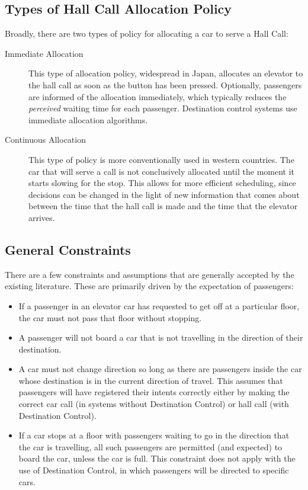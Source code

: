 \documentclass{UoYCSproject}
\begin{document}
\subsection{Types of Hall Call Allocation Policy}

Broadly, there are two types of policy for allocating a car to serve a Hall Call:  \citep{Bao1994, Rong2003, Nikovski2003}

\begin{description}
	\item[Immediate Allocation] This type of allocation policy, widespread in Japan, allocates an elevator to the hall call as soon as the button has been pressed.  Optionally, passengers are informed of the allocation immediately, which typically reduces the \textit{perceived} waiting time for each passenger.  Destination control systems use immediate allocation algorithms.
	\item[Continuous Allocation] This type of policy is more conventionally used in western countries.  The car that will serve a call is not conclusively allocated until the moment it starts slowing for the stop.  This allows for more efficient scheduling, since decisions can be changed in the light of new information that comes about between the time that the hall call is made and the time that the elevator arrives.
\end{description}

\subsection{General Constraints}

There are a few constraints and assumptions that are generally accepted by the existing literature.  These are primarily driven by the expectation of passengers:  \citep{Bao1994}

\begin{itemize}
	\item If a passenger in an elevator car has requested to get off at a particular floor, the car must not pass that floor without stopping.
	\item A passenger will not board a car that is not travelling in the direction of their destination.
	\item A car must not change direction so long as there are passengers inside the car whose destination is in the current direction of travel.  This assumes that passengers will have registered their intents correctly either by making the correct car call (in systems without Destination Control) or hall call (with Destination Control).
	\item If a car stops at a floor with passengers waiting to go in the direction that the car is travelling, all such passengers are permitted (and expected) to board the car, unless the car is full.  This constraint does not apply with the use of Destination Control, in which passengers will be directed to specific cars.
\end{itemize}
\end{document}
